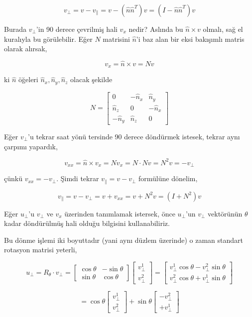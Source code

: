 \documentclass[12pt,fleqn]{article}\usepackage{../../common}
\begin{document}
$$ v_\perp = v - v_\parallel 
= v - (\hat{n}\hat{n}^T) v 
= (I - \hat{n}\hat{n}^T) v
$$

Burada $v_\perp$'in 90 derece çevrilmiş hali $v_x$ nedir? Aslında bu
$\hat{n} \times v$ olmalı, sağ el kuralıyla bu görülebilir. Eğer $N$
matrisini $\hat{n}$'i baz alan bir eksi bakışımlı matris olarak alırsak, 

$$ v_x = \hat{n} \times v = Nv $$

ki $\hat{n}$ öğeleri $\hat{n}_x,\hat{n}_y,\hat{n}_z$ olacak şekilde

$$ 
N = \left[\begin{array}{rrr}
0 & -\hat{n}_x  & \hat{n}_y \\
\hat{n}_z & 0 & -\hat{n}_x \\
-\hat{n}_y & \hat{n}_z & 0
\end{array}\right]
 $$

Eğer $v_\perp$'u tekrar saat yönü tersinde 90 derece döndürmek istesek,
tekrar aynı çarpımı yapardık,

$$ v_{xx} = \hat{n} \times v_x =  N  v_x = N \cdot N v = N^2v = -v_\perp
$$

çünkü $v_{xx} = -v_\perp$. Şimdi tekrar $v_\parallel = v - v_\perp$ formülüne dönelim,

$$ v_\parallel = v - v_\perp = v + v_{xx} = v + N^2v  = (I+N^2)v $$

Eğer $u_\perp$'u $v_\perp$ ve $v_x$ üzerinden tanımlamak istersek, önce $u_\perp$'un $v_\perp$ 
vektörünün $\theta$ kadar döndürülmüş hali olduğu bilgisini kullanabiliriz. 

Bu dönme işlemi iki boyuttadır (yani aynı düzlem üzerinde) o zaman standart
rotasyon matrisi yeterli,

$$ 
u_\perp = R_\theta \cdot v_\perp = 
\left[\begin{array}{rrr}
\cos \theta & -\sin \theta \\
\sin \theta & \cos \theta
\end{array}\right]
\left[\begin{array}{rrr}
v_\perp^1 \\
v_\perp^2
\end{array}\right] = 
\left[\begin{array}{rrr}
v_\perp^1 \cos \theta  - v_\perp^2 \sin \theta \\
v_\perp^2 \cos \theta  + v_\perp^1 \sin \theta  
\end{array}\right]
$$

$$ =
\cos \theta
\left[\begin{array}{rrr}
v_\perp^1  \\
v_\perp^2   
\end{array}\right] 
+ 
\sin \theta
\left[\begin{array}{rrr}
 - v_\perp^2  \\
 + v_\perp^1  
\end{array}\right] 
$$
\end{document}
